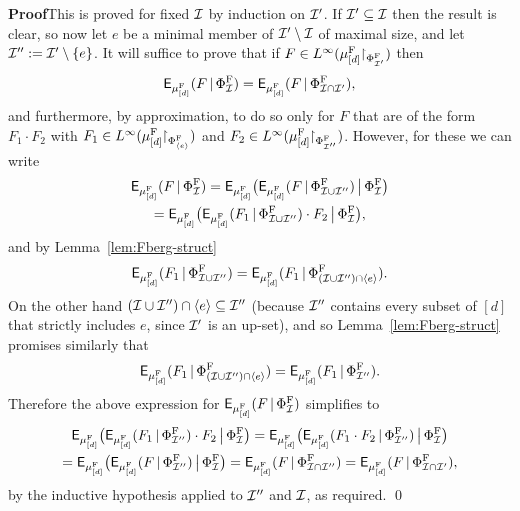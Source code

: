 \documentclass[12pt]{article}
\begin{document}
\textbf{Proof}\quad This is proved for fixed $\cal{I}$ by induction
on $\cal{I}'$. If $\cal{I}' \subseteq \cal{I}$ then the result is
clear, so now let $e$ be a minimal member of
$\cal{I}'\setminus\cal{I}$ of maximal size, and let $\cal{I}'' :=
\cal{I}'\setminus\{e\}$.  It will suffice to prove that if $F \in
L^\infty(\mu^{\rm{F}}_{[d]}\uhr_{\Phi^{\rm{F}}_{\cal{I}'}})$ then
\[\sfE_{\mu^{\rm{F}}_{[d]}}(F\,|\,\Phi^{\rm{F}}_{\cal{I}}) = \sfE_{\mu^{\rm{F}}_{[d]}}(F\,|\,\Phi^{\rm{F}}_{\cal{I}\cap\cal{I}'}),\]
and furthermore, by approximation, to do so only for $F$ that are of
the form $F_1\cdot F_2$ with $F_1 \in
L^\infty(\mu^{\rm{F}}_{[d]}\uhr_{\Phi^{\rm{F}}_{\langle e
\rangle}})$ and $F_2 \in
L^\infty(\mu^{\rm{F}}_{[d]}\uhr_{\Phi^{\rm{F}}_{\cal{I}''}})$.
However, for these we can write \begin{multline*}
\sfE_{\mu^{\rm{F}}_{[d]}}(F\,|\,\Phi^{\rm{F}}_{\cal{I}}) =
\sfE_{\mu^{\rm{F}}_{[d]}}\big(\sfE_{\mu^{\rm{F}}_{[d]}}(F\,|\,\Phi^{\rm{F}}_{\cal{I}\cup\cal{I}''})\,\big|\,\Phi^{\rm{F}}_{\cal{I}}\big)\\
=
\sfE_{\mu^{\rm{F}}_{[d]}}\big(\sfE_{\mu^{\rm{F}}_{[d]}}(F_1\,|\,\Phi^{\rm{F}}_{\cal{I}\cup\cal{I}''})\cdot
F_2\,\big|\,\Phi^{\rm{F}}_{\cal{I}}\big),
\end{multline*}
and by Lemma~\ref{lem:Fberg-struct}
\[\sfE_{\mu^{\rm{F}}_{[d]}}(F_1\,|\,\Phi^{\rm{F}}_{\cal{I}\cup\cal{I}''})
=
\sfE_{\mu^{\rm{F}}_{[d]}}(F_1\,|\,\Phi^{\rm{F}}_{(\cal{I}\cup\cal{I}'')\cap\langle
e\rangle}).\] On the other hand $(\cal{I}\cup\cal{I}'')\cap\langle
e\rangle \subseteq \cal{I}''$ (because $\cal{I}''$ contains every
subset of $[d]$ that strictly includes $e$, since $\I'$ is an
up-set), and so Lemma~\ref{lem:Fberg-struct} promises similarly that
\[\sfE_{\mu^{\rm{F}}_{[d]}}(F_1\,|\,\Phi^{\rm{F}}_{(\cal{I}\cup\cal{I}'')\cap\langle
e\rangle}) =
\sfE_{\mu^{\rm{F}}_{[d]}}(F_1\,|\,\Phi^{\rm{F}}_{\cal{I}''}).\]
Therefore the above expression for
$\sfE_{\mu^{\rm{F}}_{[d]}}(F\,|\,\Phi^{\rm{F}}_{\cal{I}})$
simplifies to
\begin{multline*}
\sfE_{\mu^{\rm{F}}_{[d]}}\big(\sfE_{\mu^{\rm{F}}_{[d]}}(F_1\,|\,\Phi^{\rm{F}}_{\cal{I}''})\cdot
F_2\,\big|\,\Phi^{\rm{F}}_{\cal{I}}\big) =
\sfE_{\mu^{\rm{F}}_{[d]}}\big(\sfE_{\mu^{\rm{F}}_{[d]}}(F_1\cdot
F_2\,|\,\Phi^{\rm{F}}_{\cal{I}''})\,\big|\,\Phi^{\rm{F}}_{\cal{I}}\big)\\
=
\sfE_{\mu^{\rm{F}}_{[d]}}\big(\sfE_{\mu^{\rm{F}}_{[d]}}(F\,|\,\Phi^{\rm{F}}_{\cal{I}''})\,\big|\,\Phi^{\rm{F}}_{\cal{I}}\big)
= \sfE_{\mu^{\rm{F}}_{[d]}}(F\,|\,\Phi^{\rm{F}}_{\cal{I}\cap
\cal{I}''}) =
\sfE_{\mu^{\rm{F}}_{[d]}}(F\,|\,\Phi^{\rm{F}}_{\cal{I}\cap\cal{I}'}),
\end{multline*}
by the inductive hypothesis applied to $\cal{I}''$ and $\cal{I}$, as
required. \qed
\end{document}
